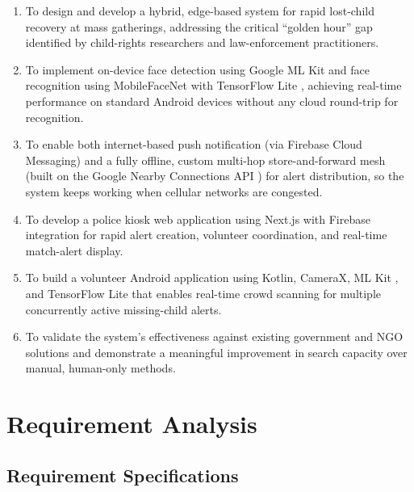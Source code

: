 \documentclass[12pt,a4paper,oneside]{report}
\begin{document}
\begin{enumerate}
  \item To design and develop a hybrid, edge-based system for rapid
        lost-child recovery at mass gatherings, addressing the critical
        ``golden hour'' gap identified by child-rights researchers and
        law-enforcement practitioners.
  \item To implement on-device face detection using Google ML Kit
        \cite{mlkit} and face recognition using MobileFaceNet
        \cite{mobilefacenet} with TensorFlow Lite \cite{tflite}, achieving
        real-time performance on standard Android devices without any
        cloud round-trip for recognition.
  \item To enable both internet-based push notification (via Firebase
        \cite{firebase} Cloud Messaging) and a fully offline, custom
        multi-hop store-and-forward mesh (built on the Google Nearby
        Connections API \cite{nearby}) for alert distribution, so the
        system keeps working when cellular networks are congested.
  \item To develop a police kiosk web application using Next.js with
        Firebase integration for rapid alert creation, volunteer
        coordination, and real-time match-alert display.
  \item To build a volunteer Android application using Kotlin, CameraX, ML
        Kit \cite{mlkit}, and TensorFlow Lite \cite{tflite} that enables
        real-time crowd scanning for multiple concurrently active
        missing-child alerts.
  \item To validate the system's effectiveness against existing government
        and NGO solutions and demonstrate a meaningful improvement in
        search capacity over manual, human-only methods.
\end{enumerate}

\chapter{Requirement Analysis}

\section{Requirement Specifications}
\end{document}
